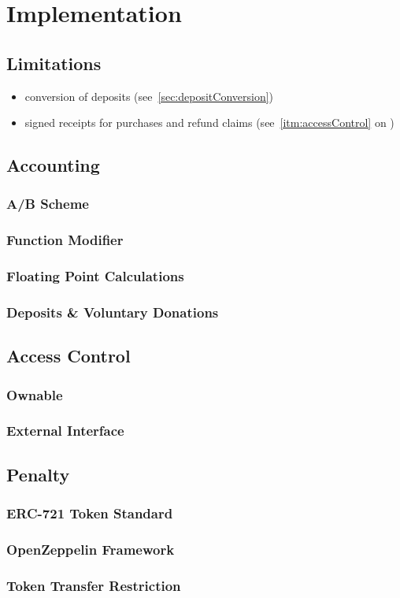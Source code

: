 
\chapter{Implementation}
\label{chp:implementation}

\section{Limitations}
\begin{itemize}
  \item conversion of deposits (see~\ref{sec:depositConversion})
  \item signed receipts for purchases and refund claims (see~\ref{itm:accessControl} on )
\end{itemize}


\section{Accounting}

\subsection{A/B Scheme}
\subsection{Function Modifier}
\subsection{Floating Point Calculations}
\subsection{Deposits \& Voluntary Donations}

\section{Access Control}
\subsection{Ownable}
\subsection{External Interface}

\section{Penalty}
\subsection{ERC-721 Token Standard}
\subsection{OpenZeppelin Framework}
\subsection{Token Transfer Restriction}